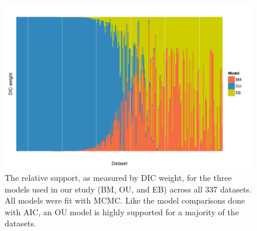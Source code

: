 \documentclass[12pt,twoside]{article}
\begin{document}

\begin{figure}[p]
  \centering
  \includegraphics[angle=90, origin=c, scale=0.8]{figs/dic-support}
  \caption[Relative model support (Bayesian)]{The relative support, as measured by DIC weight, for the three models used in our study (BM, OU, and EB) across all 337 datasets. All models were fit with MCMC. Like the model comparisons done with AIC, an OU model is highly supported for a majority of the datasets.}
  \label{fig:supp-dic-support}
\end{figure}
\end{document}
